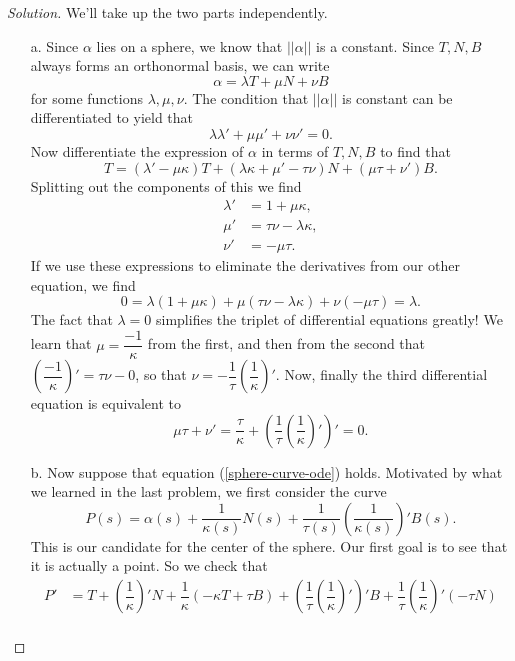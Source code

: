 \documentclass[Shifrin_Solutions_Spring_2018]{subfiles}
\begin{document}
\begin{proof}[Solution] We'll take up the two parts independently.
\begin{itemize}
\item[a.] Since $\alpha$ lies on a sphere, we know that $||\alpha||$ is a constant. 
Since $T, N, B$ always forms an orthonormal basis, we can write
\[
\alpha = \lambda T + \mu N + \nu B
\]
for some functions $\lambda, \mu, \nu$.  The condition that $||\alpha||$ is constant 
can be differentiated to yield that
\begin{equation*}
\lambda \lambda' + \mu \mu' + \nu\nu' = 0.
\end{equation*}
Now differentiate the expression of $\alpha$ in terms of $T, N, B$ to find that
\begin{equation*}
T = (\lambda' - \mu \kappa) T + (\lambda \kappa + \mu' -\tau \nu) N + ( \mu \tau+ \nu') B .
\end{equation*}
Splitting out the components of this we find
\begin{align*}
\lambda' & = 1 + \mu \kappa , \\
\mu ' & = \tau \nu - \lambda \kappa , \\
\nu' & = -\mu \tau .
\end{align*}
If we use these expressions to eliminate the derivatives from our other equation, we find
\[
0 = \lambda (1+\mu \kappa) + \mu (\tau \nu - \lambda \kappa) + \nu (-\mu\tau) = \lambda.
\]
The fact that $\lambda = 0$ simplifies the triplet of differential equations greatly! 
We learn that  $\mu = \dfrac{-1}{\kappa}$ from the first, and then from the second that
$ \left( \dfrac{-1}{\kappa}\right)' = \tau \nu -0$, so that $\nu = 
-\dfrac{1}{\tau}\left(\dfrac{1}{\kappa}\right)'$. Now, finally the third differential 
equation is equivalent to
\[
\mu \tau + \nu' = \dfrac{\tau}{\kappa} 
+ \left(\dfrac{1}{\tau} \left(\dfrac{1}{\kappa}\right)' \right)' =0 .
\]
\clearpage
\item[b.]  Now suppose that equation (\ref{sphere-curve-ode}) holds. Motivated by what 
we learned in the last problem, we first consider the curve
\[
P(s) = \alpha(s) + \dfrac{1}{\kappa(s)} N(s) 
+ \dfrac{1}{\tau(s)}\left( \dfrac{1}{\kappa(s)}\right)' B(s) .
\]
This is our candidate for the center of the sphere. Our first goal is to see that it is 
actually a point. So we check that
\[
\begin{split}
P' &= T + \left(\dfrac{1}{\kappa}\right)' N + \dfrac{1}{\kappa} (-\kappa T + \tau B ) 
 + \left(\dfrac{1}{\tau}\left( \dfrac{1}{\kappa}\right)'\right)' B 
 + \dfrac{1}{\tau}\left(\dfrac{1}{\kappa}\right)' (-\tau N) \\

\end{split}\]
\end{itemize}
\end{proof}
\end{document}
